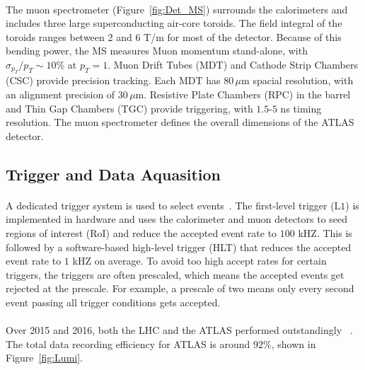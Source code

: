 \paragraph{}
The muon spectrometer (Figure~\ref{fig:Det_MS}) surrounds the calorimeters and includes three large superconducting air-core toroids. 
The field integral of the toroids ranges between 2 and 6 T/m for most of the detector. Because of this bending power, the MS measures Muon momentum stand-alone, with $\sigma_{p_{T}}/p_{T} \sim 10\%$ at $p_{T} = 1$\TeV. 
Muon Drift Tubes (MDT) and Cathode Strip Chambers (CSC) provide precision tracking. 
Each MDT has $80\,\mu\textrm{m}$ spacial resolution, with an alignment precision of $30\,\mu\textrm{m}$.
Resistive Plate Chambers (RPC) in the barrel and Thin Gap Chambers (TGC) provide triggering, with $1.5$-$5$ ns timing resolution.  The muon spectrometer defines the overall dimensions of the ATLAS
detector.

\subsection{Trigger and Data Aquasition}
\paragraph{}
A dedicated trigger system is used to select events~\cite{ATLAS-TRIGGER}.
The first-level trigger (L$1$) is implemented in hardware and uses the calorimeter and muon detectors to seed regions of interest (RoI) and reduce the accepted event rate to $100$ kHZ.
This is followed by a software-based high-level trigger (HLT) that reduces the accepted event rate to $1$ kHZ on average. 
To avoid too high accept rates for certain triggers, the triggers are often prescaled, which means the accepted events get rejected at the prescale. For example, a prescale of two means only every second event passing all trigger conditions gets accepted. 

\paragraph{}
Over 2015 and 2016, both the LHC and the ATLAS performed outstandingly ~\cite{Lumi_Run2}. The total data recording efficiency for ATLAS is around $92\%$, shown in Figure~\ref{fig:Lumi}.

